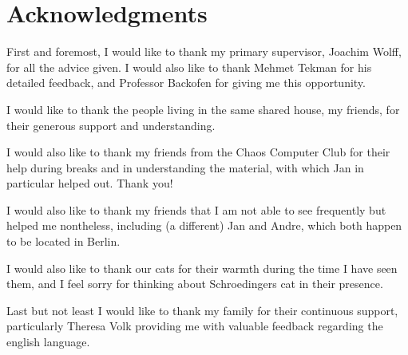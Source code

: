 \chapter{Acknowledgments}

First and foremost, I would like to thank my primary supervisor, Joachim Wolff,
for all the advice given. I would also like to thank Mehmet Tekman for his
detailed feedback, and Professor Backofen for giving me this opportunity.

I would like to thank the people living in the same shared house, my friends,
for their generous support and understanding.

I would also like to thank my friends from the Chaos Computer Club for their
help during breaks and in understanding the material, with which Jan in
particular helped out. Thank you!

I would also like to thank my friends that I am not able to see frequently but
helped me nontheless, including (a different) Jan and Andre, which both happen
to be located in Berlin.

I would also like to thank our cats for their warmth during the time I have seen
them, and I feel sorry for thinking about Schroedingers cat in their presence.

Last but not least I would like to thank my family for their continuous
support, particularly Theresa Volk providing me with valuable feedback
regarding the english language.


